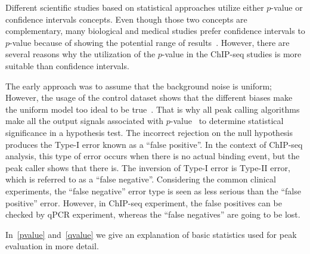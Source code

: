 Different scientific studies based on statistical approaches utilize either $p$-value or confidence intervals concepts. 
Even though those two concepts are complementary, many biological and medical studies prefer confidence intervals to $p$-value because of showing the potential range of results~\cite{feinstein1998p}.
However, there are several reasons why the utilization of the $p$-value in the ChIP-seq studies is more suitable than confidence intervals.


The early approach was to assume that the background noise is uniform; 
However, the usage of the control dataset shows that the different biases make the uniform model too ideal to be true~\cite{robertson2007genome}. 
That is why all peak calling algorithms make all the output signals associated with $p$-value~\cite{chitpin2019recap} to determine statistical significance in a hypothesis test. 
The incorrect rejection on the null hypothesis produces the Type-I error known as a ``false positive''. 
In the context of ChIP-seq analysis, this type of error occurs when there is no actual binding event, but the peak caller shows that there is. 
The inversion of Type-I error is Type-II error, which is referred to as a ``false negative''. 
Considering the common clinical experiments, the ``false negative'' error type is seen as less serious than the ``false positive'' error.
However, in ChIP-seq experiment, the false positives can be checked by qPCR experiment, whereas the ``false negatives'' are going to be lost. 

In~\ref{pvalue} and~\ref{qvalue} we give an explanation of basic statistics used for peak evaluation in more detail.




